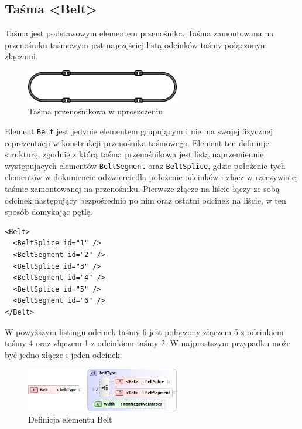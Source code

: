 \documentclass[12pt,a4paper]{article}
\begin{document}
\subsection{Taśma <Belt>}\label{sec:Belt}
Taśma jest podstawowym elementem przenośnika. Taśma zamontowana na przenośniku
taśmowym jest najczęściej listą odcinków taśmy połączonym złączami.

\begin{figure}[H]
  \centering
  \includegraphics[width=0.6\textwidth]{png/tasma}
  \caption{Taśma przenośnikowa w uproszczeniu}
  \label{fig:belt-drw}
\end{figure}

Element {\tt Belt} jest jedynie elementem grupującym i nie ma swojej fizycznej
reprezentacji w konstrukcji przenośnika taśmowego. Element ten definiuje
strukturę, zgodnie z którą taśma przenośnikowa jest listą naprzemiennie
występujących elementów {\tt BeltSegment} oraz {\tt BeltSplice}, gdzie położenie
tych elementów w dokumencie odzwierciedla położenie odcinków i złącz w
rzeczywistej taśmie zamontowanej na przenośniku. Pierwsze złącze na liście łączy
ze sobą odcinek następujący bezpośrednio po nim oraz ostatni odcinek na liście,
w ten sposób domykając pętlę.

\begin{verbatim}
<Belt>
  <BeltSplice id="1" />
  <BeltSegment id="2" />
  <BeltSplice id="3" />
  <BeltSegment id="4" />
  <BeltSplice id="5" />
  <BeltSegment id="6" />
</Belt>
\end{verbatim}

W powyższym listingu odcinek taśmy 6 jest połączony złączem 5 z odcinkiem taśmy
4 oraz złączem 1 z odcinkiem taśmy 2. W najprostszym przypadku może być jedno
złącze i jeden odcinek.

\begin{figure}[H]
  \centering
  \includegraphics[width=0.6\textwidth]{png/belt_xsd2}
  \caption{Definicja elementu Belt}
  \label{fig:belt-xsd}
\end{figure}
\end{document}
